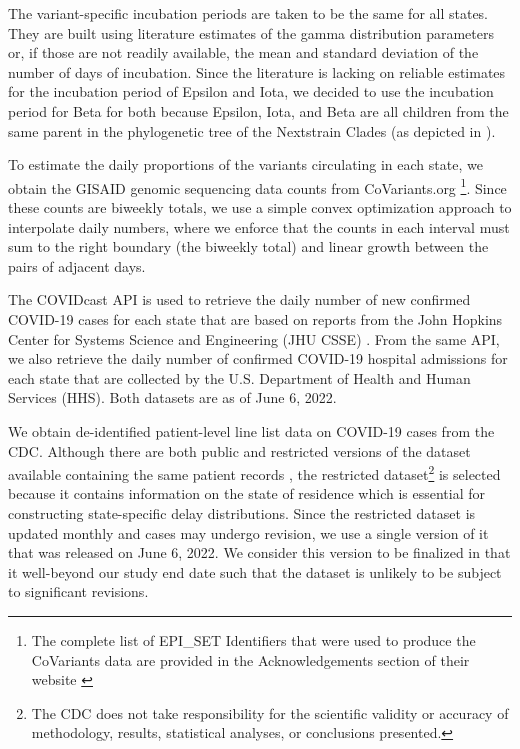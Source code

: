 \documentclass{article}
\newcommand{\attn}[1]{\textcolor{red}{ATTN: #1}}
\begin{document}

The variant-specific incubation periods are taken to be the same for all states. They are built using literature estimates of the gamma distribution parameters or, if those are not readily available, the mean and standard deviation of the number of days of incubation. Since the literature is lacking on reliable estimates for the incubation period of Epsilon and Iota, we decided to use the incubation period for Beta for both because Epsilon, Iota, and Beta are all children from the same parent in the phylogenetic tree of the Nextstrain Clades (as depicted in \citet{hodcroft2021covariants}).

To estimate the daily proportions of the variants circulating in each state, we obtain the GISAID genomic sequencing data counts from CoVariants.org \citep{hodcroft2021covariants, elbe2017data}\footnote{The complete list of EPI\_SET Identifiers that were used to produce the CoVariants data are provided in the Acknowledgements section of their website \citep{hodcroft2021covariants}}. Since these counts are biweekly totals, we use a simple convex optimization approach to interpolate daily numbers, where we enforce that the counts in each interval must sum to the right boundary (the biweekly total) and linear growth between the pairs of adjacent days. 

The COVIDcast API \citep{reinhart2021open} is used to retrieve the daily number of new confirmed COVID-19 cases for each state that are based on reports from the John Hopkins Center for Systems Science and Engineering (JHU CSSE) \citep{dong2020interactive}. From the same API, we also retrieve the daily number of confirmed COVID-19 hospital admissions for each state that are collected by the U.S. Department of Health and Human Services (HHS). Both datasets are as of June 6, 2022.

We obtain de-identified patient-level line list data on COVID-19 cases from the CDC. Although there are both public and restricted versions of the dataset available containing the same patient records \citep{cdc2020casepub, cdc2020caserestr}, the restricted dataset\footnote{The CDC does not take responsibility for the scientific validity or accuracy of methodology, results, statistical analyses, or conclusions presented.} is selected because it contains information on the state of residence which is essential for constructing state-specific delay distributions. Since the restricted dataset is updated monthly and cases may undergo revision, we use a single version of it that was released on June 6, 2022. We consider this version to be finalized in that it well-beyond our study end date such that the dataset is unlikely to be subject to significant revisions.
\end{document}
